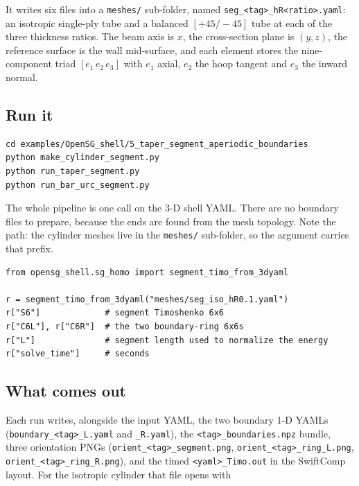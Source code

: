 It writes six files into a \texttt{meshes/} sub-folder, named
\texttt{seg\_<tag>\_hR<ratio>.yaml}: an isotropic single-ply tube and a balanced
$[+45/-45]$ tube at each of the three thickness ratios. The beam axis is $x$, the
cross-section plane is $(y,z)$, the reference surface is the wall mid-surface,
and each element stores the nine-component triad $[e_1\,e_2\,e_3]$ with $e_1$
axial, $e_2$ the hoop tangent and $e_3$ the inward normal.

\subsection{Run it}

\begin{lstlisting}[style=shellst]
cd examples/OpenSG_shell/5_taper_segment_aperiodic_boundaries
python make_cylinder_segment.py
python run_taper_segment.py
python run_bar_urc_segment.py
\end{lstlisting}

The whole pipeline is one call on the 3-D shell YAML. There are no boundary files
to prepare, because the ends are found from the mesh topology. Note the path: the
cylinder meshes live in the \texttt{meshes/} sub-folder, so the argument carries
that prefix.

\begin{lstlisting}[style=opensg,caption={The segment call, with the meshes/ path used by run\_taper\_segment.py.}]
from opensg_shell.sg_homo import segment_timo_from_3dyaml

r = segment_timo_from_3dyaml("meshes/seg_iso_hR0.1.yaml")
r["S6"]             # segment Timoshenko 6x6
r["C6L"], r["C6R"]  # the two boundary-ring 6x6s
r["L"]              # segment length used to normalize the energy
r["solve_time"]     # seconds
\end{lstlisting}

\subsection{What comes out}

Each run writes, alongside the input YAML, the two boundary 1-D YAMLs
(\texttt{boundary\_<tag>\_L.yaml} and \texttt{\_R.yaml}), the
\texttt{<tag>\_boundaries.npz} bundle, three orientation PNGs
(\texttt{orient\_<tag>\_segment.png}, \texttt{orient\_<tag>\_ring\_L.png},
\texttt{orient\_<tag>\_ring\_R.png}), and the timed \texttt{<yaml>\_Timo.out} in
the SwiftComp layout. For the isotropic cylinder that file opens with

